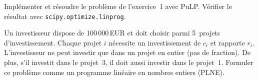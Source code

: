 \begin{exercice}
Impl\'ementer et r\'esoudre le probl\`eme de l'exercice~1 avec PuLP.
V\'erifier le r\'esultat avec \texttt{scipy.optimize.linprog}.
\end{exercice}

\begin{exercice}
Un investisseur dispose de 100\,000\,EUR et doit choisir parmi 5~projets
d'investissement.  Chaque projet $i$ n\'ecessite un investissement de $c_i$ et
rapporte $r_i$.  L'investisseur ne peut investir que dans un projet en entier
(pas de fraction).  De plus, s'il investit dans le projet~3, il doit aussi
investir dans le projet~1.  Formuler ce probl\`eme comme un programme lin\'eaire
en nombres entiers (PLNE).
\end{exercice}

